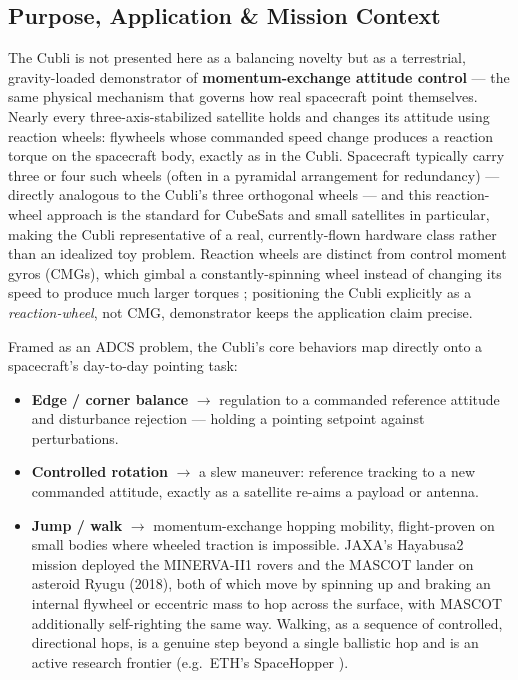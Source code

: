 \subsection{Purpose, Application \& Mission Context}
\label{sec:application}

The Cubli is not presented here as a balancing novelty but as a terrestrial, gravity-loaded demonstrator of \textbf{momentum-exchange attitude control} — the same physical mechanism that governs how real spacecraft point themselves. Nearly every three-axis-stabilized satellite holds and changes its attitude using reaction wheels: flywheels whose commanded speed change produces a reaction torque on the spacecraft body, exactly as in the Cubli. Spacecraft typically carry three or four such wheels (often in a pyramidal arrangement for redundancy) — directly analogous to the Cubli's three orthogonal wheels — and this reaction-wheel approach is the standard for CubeSats and small satellites in particular, making the Cubli representative of a real, currently-flown hardware class rather than an idealized toy problem. Reaction wheels are distinct from control moment gyros (CMGs), which gimbal a constantly-spinning wheel instead of changing its speed to produce much larger torques \cite{votel2012cmgvsrw}; positioning the Cubli explicitly as a \emph{reaction-wheel}, not CMG, demonstrator keeps the application claim precise.

Framed as an ADCS problem, the Cubli's core behaviors map directly onto a spacecraft's day-to-day pointing task:

\begin{itemize}
    \item \textbf{Edge / corner balance} $\rightarrow$ regulation to a commanded reference attitude and disturbance rejection — holding a pointing setpoint against perturbations.
    \item \textbf{Controlled rotation} $\rightarrow$ a slew maneuver: reference tracking to a new commanded attitude, exactly as a satellite re-aims a payload or antenna.
    \item \textbf{Jump / walk} $\rightarrow$ momentum-exchange hopping mobility, flight-proven on small bodies where wheeled traction is impossible. JAXA's Hayabusa2 mission deployed the MINERVA-II1 rovers \cite{yoshimitsu1999minerva} and the MASCOT lander \cite{ho2017mascot} on asteroid Ryugu (2018), both of which move by spinning up and braking an internal flywheel or eccentric mass to hop across the surface, with MASCOT additionally self-righting the same way. Walking, as a sequence of controlled, directional hops, is a genuine step beyond a single ballistic hop and is an active research frontier (e.g.\ ETH's SpaceHopper \cite{spiridonov2024spacehopper}).
\end{itemize}

